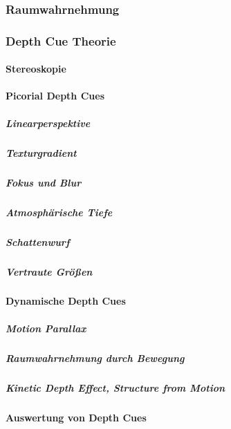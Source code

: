 \documentclass[a4paper, 11pt, accentcolor = tud3b]{tudreport}
\begin{document}
				\subsubsection{Raumwahrnehmung} %

				\subsubsection{Depth Cue Theorie} %

					\paragraph{Stereoskopie} %

					\paragraph{Picorial Depth Cues} %

						\subparagraph{Linearperspektive} %

						\subparagraph{Texturgradient} %

						\subparagraph{Fokus und Blur} %

						\subparagraph{Atmosphärische Tiefe} %

						\subparagraph{Schattenwurf} %

						\subparagraph{Vertraute Größen} %

					\paragraph{Dynamische Depth Cues} %

						\subparagraph{Motion Parallax} %

						\subparagraph{Raumwahrnehmung durch Bewegung} %

						\subparagraph{Kinetic Depth Effect, Structure from Motion} %

					\paragraph{Auswertung von Depth Cues} %
\end{document}
